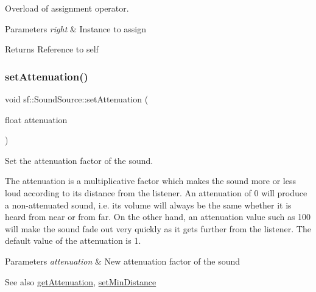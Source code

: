 Overload of assignment operator. 


\begin{DoxyParams}{Parameters}
{\em right} & Instance to assign\\
\hline
\end{DoxyParams}
\begin{DoxyReturn}{Returns}
Reference to self 
\end{DoxyReturn}
\mbox{\label{classsf_1_1_sound_source_aa2adff44cd2f8b4e3c7315d7c2a45626}} 
\subsubsection{\texorpdfstring{set\+Attenuation()}{setAttenuation()}}
{\footnotesize\ttfamily void sf\+::\+Sound\+Source\+::set\+Attenuation (\begin{DoxyParamCaption}\item[{float}]{attenuation }\end{DoxyParamCaption})}



Set the attenuation factor of the sound. 

The attenuation is a multiplicative factor which makes the sound more or less loud according to its distance from the listener. An attenuation of 0 will produce a non-\/attenuated sound, i.\+e. its volume will always be the same whether it is heard from near or from far. On the other hand, an attenuation value such as 100 will make the sound fade out very quickly as it gets further from the listener. The default value of the attenuation is 1.


\begin{DoxyParams}{Parameters}
{\em attenuation} & New attenuation factor of the sound\\
\hline
\end{DoxyParams}
\begin{DoxySeeAlso}{See also}
\hyperlink{classsf_1_1_sound_source_a8ad7dafb4f1b4afbc638cebe24f48cc9}{get\+Attenuation}, \hyperlink{classsf_1_1_sound_source_a75bbc2c34addc8b25a14edb908508afe}{set\+Min\+Distance} 
\end{DoxySeeAlso}
\mbox{\label{classsf_1_1_sound_source_a75bbc2c34addc8b25a14edb908508afe}} 
